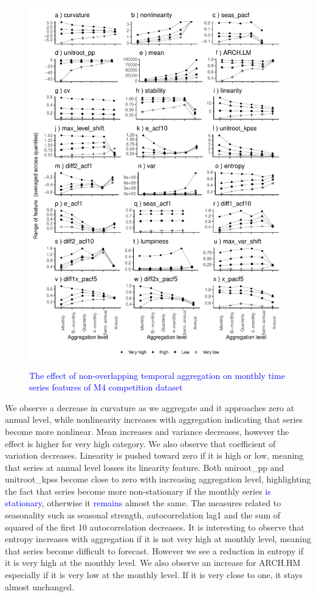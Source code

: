 \documentclass[preprint, 3p,
authoryear]{elsarticle} %
\begin{document}
\begin{figure}[H]

{\centering \includegraphics[width=0.7\linewidth]{img/300dpi/mp_category_all1} 

}

\caption{ \textcolor{blue}{The effect of non-overlapping temporal aggregation on monthly time series features of M4 competition dataset} }\label{fig:featureagg1}
\end{figure}

We observe a decrease in curvature as we aggregate and it approaches
zero at annual level, while nonlinearity increases with aggregation
indicating that series become more nonlinear. Mean increases and
variance decreases, however the effect is higher for very high category.
We also observe that coefficient of variation decreases. Linearity is
pushed toward zero if it is high or low, meaning that series at annual
level losses its linearity feature. Both uniroot\_pp and unitroot\_kpss
become close to zero with increasing aggregation level, highlighting the
fact that series become more non-stationary if the monthly series
\textcolor{blue}{is stationary}, otherwise it \textcolor{blue}{remains}
almost the same. The measures related to seasonality such as seasonal
strength, autocorrelation lag1 and the sum of squared of the first 10
autocorrelation decreases. It is interesting to observe that entropy
increases with aggregation if it is not very high at monthly level,
meaning that series become difficult to forecast. However we see a
reduction in entropy if it is very high at the monthly level. We also
observe an increase for ARCH.HM especially if it is very low at the
monthly level. If it is very close to one, it stays almost unchanged.
\end{document}
